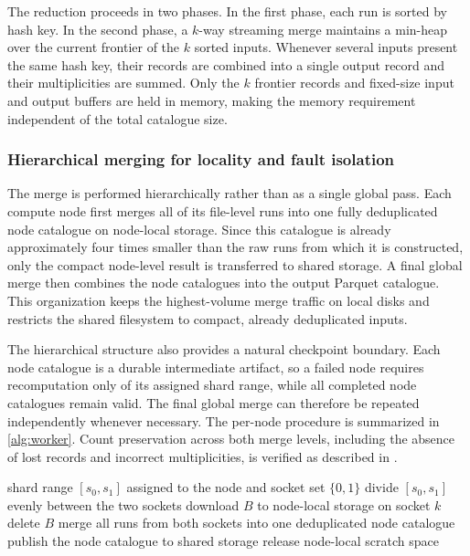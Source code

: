 \documentclass[appliedmath,article,submit,moreauthors]{Definitions/mdpi}
\begin{document}
The reduction proceeds in two phases. In the first phase, each run is sorted by
hash key. In the second phase, a \(k\)-way streaming merge maintains a min-heap
over the current frontier of the \(k\) sorted inputs. Whenever several inputs
present the same hash key, their records are combined into a single output
record and their multiplicities are summed. Only the \(k\) frontier records and
fixed-size input and output buffers are held in memory, making the memory
requirement independent of the total catalogue size.

\subsubsection{Hierarchical merging for locality and fault isolation}

The merge is performed hierarchically rather than as a single global pass. Each
compute node first merges all of its file-level runs into one fully deduplicated
node catalogue on node-local storage. Since this catalogue is already
approximately four times smaller than the raw runs from which it is constructed,
only the compact node-level result is transferred to shared storage. A final
global merge then combines the node catalogues into the output Parquet
catalogue. This organization keeps the highest-volume merge traffic on local
disks and restricts the shared filesystem to compact, already deduplicated
inputs.

The hierarchical structure also provides a natural checkpoint boundary. Each
node catalogue is a durable intermediate artifact, so a failed node requires
recomputation only of its assigned shard range, while all completed node
catalogues remain valid. The final global merge can therefore be repeated
independently whenever necessary. The per-node procedure is summarized in
\cref{alg:worker}. Count preservation across both merge levels, including the
absence of lost records and incorrect multiplicities, is verified as described
in .

\begin{algorithm}[H]
\caption{Per-node streaming worker, with one task assigned to each compute node.}
\label{alg:worker}
\begin{algorithmic}[1]
\Require shard range \([s_0,s_1]\) assigned to the node and socket set \(\{0,1\}\)
\State divide \([s_0,s_1]\) evenly between the two sockets
    \State download \(B\) to node-local storage 
    \State {} on socket \(k\)
    \State delete \(B\) 
  \EndFor
\EndFor
\State merge all runs from both sockets into one deduplicated node catalogue
\State publish the node catalogue to shared storage
\State release node-local scratch space
\end{algorithmic}
\end{algorithm}
\end{document}
